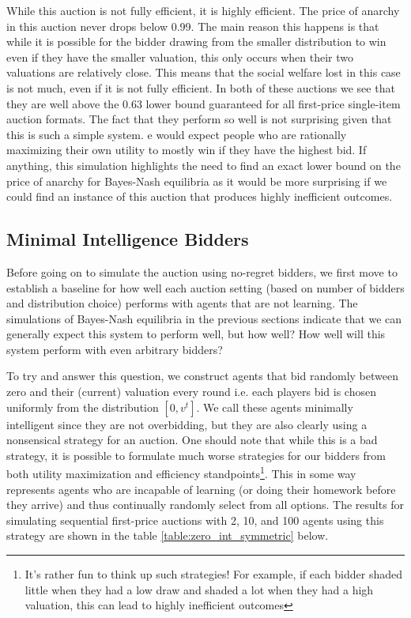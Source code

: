\documentclass[12pt,twoside]{reedthesis}
\begin{document}
While this auction is not fully efficient, it is highly efficient. The price of anarchy in this auction never drops below 0.99. The main reason this happens is that while it is possible for the bidder drawing from the smaller distribution to win even if they have the smaller valuation, this only occurs when their two valuations are relatively close. This means that the social welfare lost in this case is not much, even if it is not fully efficient. In both of these auctions we see that they are well above the $0.63$ lower bound guaranteed for all first-price single-item auction formats. The fact that they perform so well is not surprising given that this is such a simple system. e would expect people who are rationally maximizing their own utility to mostly win if they have the highest bid. If anything, this simulation highlights the need to find an exact lower bound on the price of anarchy for Bayes-Nash equilibria as it would be more surprising if we could find an instance of this auction that produces highly inefficient outcomes.

\subsection{Minimal Intelligence Bidders}
Before going on to simulate the auction using no-regret bidders, we first move to establish a baseline for how well each auction setting (based on number of bidders and distribution choice) performs with agents that are not learning. The simulations of Bayes-Nash equilibria in the previous sections indicate that we can generally expect this system to perform well, but how well? How well will this system perform with even arbitrary bidders?
 
To try and answer this question, we construct agents that bid randomly between zero and their (current) valuation every round i.e. each players bid is chosen uniformly from the distribution $[0,v^t]$. We call these agents minimally intelligent since they are not overbidding, but they are also clearly using a nonsensical strategy for an auction. One should note that while this is a bad strategy, it is possible to formulate much worse strategies for our bidders from both utility maximization and efficiency standpoints\footnote{It's rather fun to think up such strategies! For example, if each bidder shaded little when they had a low draw and shaded a lot when they had a high valuation, this can lead to highly inefficient outcomes}. This in some way represents agents who are incapable of learning (or doing their homework before they arrive) and thus continually randomly select from all options. The results for simulating sequential first-price auctions with 2, 10, and 100 agents using this strategy are shown in the table \ref{table:zero_int_symmetric} below.
\end{document}
